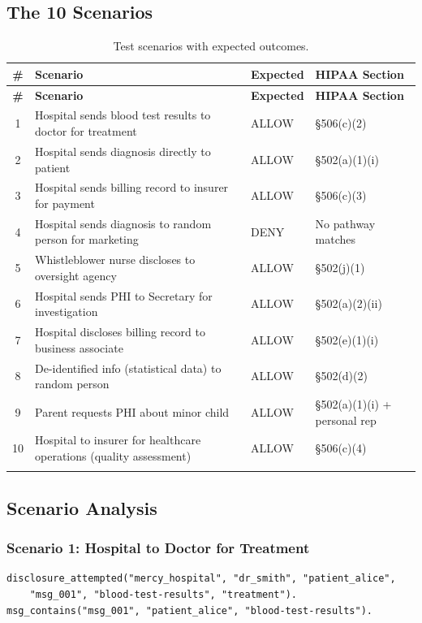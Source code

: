 \documentclass[11pt,letterpaper]{article}
\begin{document}
\subsection{The 10 Scenarios}

\begin{longtable}{cp{5.5cm}lp{3.5cm}}
\toprule
\textbf{\#} & \textbf{Scenario} & \textbf{Expected} & \textbf{HIPAA Section} \\
\midrule
\endfirsthead
\toprule
\textbf{\#} & \textbf{Scenario} & \textbf{Expected} & \textbf{HIPAA Section} \\
\midrule
\endhead
1 & Hospital sends blood test results to doctor for treatment & ALLOW & \S 506(c)(2) \\
2 & Hospital sends diagnosis directly to patient & ALLOW & \S 502(a)(1)(i) \\
3 & Hospital sends billing record to insurer for payment & ALLOW & \S 506(c)(3) \\
4 & Hospital sends diagnosis to random person for marketing & DENY & No pathway matches \\
5 & Whistleblower nurse discloses to oversight agency & ALLOW & \S 502(j)(1) \\
6 & Hospital sends PHI to Secretary for investigation & ALLOW & \S 502(a)(2)(ii) \\
7 & Hospital discloses billing record to business associate & ALLOW & \S 502(e)(1)(i) \\
8 & De-identified info (statistical data) to random person & ALLOW & \S 502(d)(2) \\
9 & Parent requests PHI about minor child & ALLOW & \S 502(a)(1)(i) + personal rep \\
10 & Hospital to insurer for healthcare operations (quality assessment) & ALLOW & \S 506(c)(4) \\
\bottomrule
\caption{Test scenarios with expected outcomes.}
\label{tab:scenarios}
\end{longtable}

\subsection{Scenario Analysis}

\subsubsection{Scenario 1: Hospital to Doctor for Treatment}

\begin{lstlisting}[style=soufflestyle,caption={Scenario 1 facts}]
disclosure_attempted("mercy_hospital", "dr_smith", "patient_alice",
    "msg_001", "blood-test-results", "treatment").
msg_contains("msg_001", "patient_alice", "blood-test-results").
\end{lstlisting}
\end{document}
